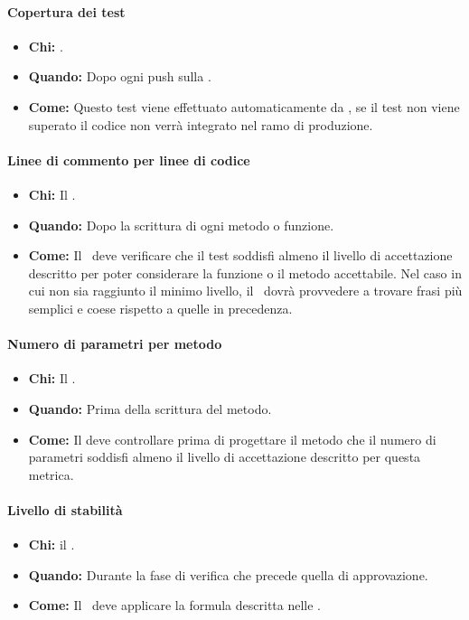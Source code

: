\paragraph{Copertura dei test}
\begin{itemize}
\item \textbf{Chi:} .
\item \textbf{Quando:} Dopo ogni push sulla .
\item \textbf{Come:} Questo test viene effettuato automaticamente da , se il test non viene superato il codice non verrà integrato nel ramo di produzione.
\end{itemize}

\paragraph{Linee di commento per linee di codice}
\begin{itemize}
\item \textbf{Chi:} Il \Progr.
\item \textbf{Quando:} Dopo la scrittura di ogni metodo o funzione.
\item \textbf{Come:} Il \Progr\ deve verificare che il test soddisfi almeno il livello di accettazione descritto per poter considerare la funzione o il metodo accettabile. Nel caso in cui non sia raggiunto il minimo livello, il \Prog\ dovrà provvedere a trovare frasi più semplici e coese rispetto a quelle in precedenza. 
\end{itemize}

\paragraph{Numero di parametri per metodo}
\begin{itemize}
\item \textbf{Chi:} Il \Prog.
\item \textbf{Quando:} Prima della scrittura del metodo.
\item \textbf{Come:} Il \Prog deve controllare prima di progettare il metodo che il numero di parametri soddisfi almeno il livello di accettazione descritto per questa metrica.
\end{itemize}

\paragraph{Livello di stabilità}
\begin{itemize}
\item \textbf{Chi:} il \Ver.
\item \textbf{Quando:} Durante la fase di verifica che precede quella di approvazione.
\item \textbf{Come:} Il \Ver\ deve applicare la formula descritta nelle \NdP.
\end{itemize}